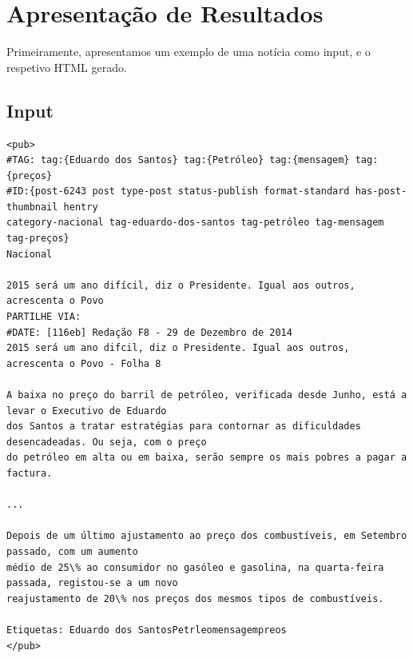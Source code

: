 \documentclass[25pt]{article}
\begin{document}
    \section{Apresentação de Resultados}
    Primeiramente, apresentamos um exemplo de uma notícia como input, e o respetivo HTML gerado.

    \subsection{Input}
    \begin{verbatim}
<pub>
#TAG: tag:{Eduardo dos Santos} tag:{Petróleo} tag:{mensagem} tag:{preços} 
#ID:{post-6243 post type-post status-publish format-standard has-post-thumbnail hentry 
category-nacional tag-eduardo-dos-santos tag-petróleo tag-mensagem tag-preços}
Nacional

2015 será um ano dif­ícil, diz o Presidente. Igual aos outros, acrescenta o Povo
PARTILHE VIA:     
#DATE: [116eb] Redação F8 - 29 de Dezembro de 2014
2015 será um ano dif­cil, diz o Presidente. Igual aos outros, acrescenta o Povo - Folha 8

A baixa no preço do barril de petróleo, verificada desde Junho, está a levar o Executivo de Eduardo
dos Santos a tratar estratégias para contornar as dificuldades desencadeadas. Ou seja, com o preço
do petróleo em alta ou em baixa, serão sempre os mais pobres a pagar a factura.

...

Depois de um último ajustamento ao preço dos combust­íveis, em Setembro passado, com um aumento
médio de 25\% ao consumidor no gasóleo e gasolina, na quarta-feira passada, registou-se a um novo
reajustamento de 20\% nos preços dos mesmos tipos de combust­íveis.      

Etiquetas: Eduardo dos SantosPetrleomensagempreos
</pub>
    \end{verbatim}
\end{document}
